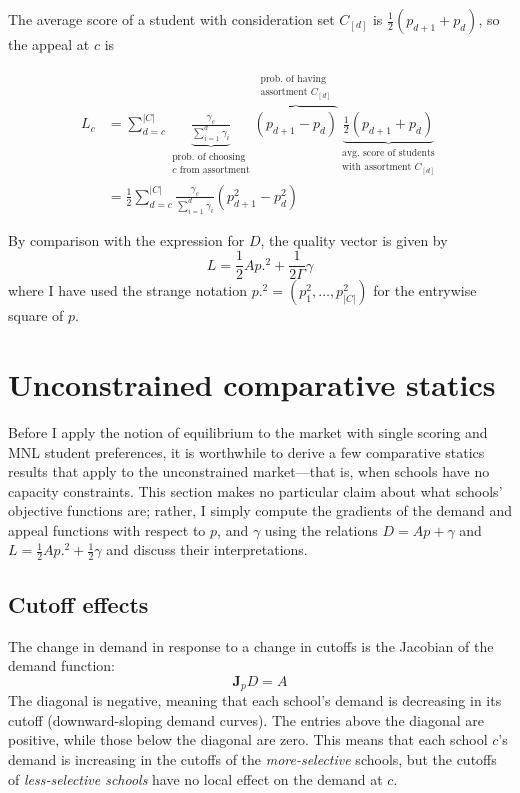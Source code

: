 \documentclass[12pt]{article}
\theoremstyle{definition}
\begin{document}
The average score of a student with consideration set $C_{[d]}$ is $\frac{1}{2}\left(p_{d+1} + p_d\right)$, so the appeal at $c$ is

\begin{align}
L_c &= \sum_{d=c}^{|C|} 
\underbrace{\frac{{\gamma_c}}{ \sum_{i=1}^d {\gamma_i}}}_{\substack{\text{prob. of choosing  }\\ c\text{ from assortment}}} 
\overbrace{\left(p_{d+1} - p_{d}\right)}^{\substack{\text{prob. of having}\\ \text{assortment }C_{[d]}}} 
\underbrace{\frac{1}{2}\left(p_{d+1} + p_{d}\right)}_{\substack{\text{avg. score of students}\\ \text{with assortment }C_{[d]}}} \\
&=\frac{1}{2}\sum_{d=c}^{|C|} 
\frac{{\gamma_c}}{ \sum_{i=1}^d {\gamma_i}} 
\left(p_{d+1}^2 -  p_{d}^2\right)
\end{align}

By comparison with the expression for $D$, the quality vector is given by 
\[L = \frac{1}{2} A p.^2 + \frac{1}{2\Gamma} \gamma\]
where I have used the strange notation $p.^2 = (p_1^2, \dots, p_{|C|}^2)$ for the entrywise square of $p$.






\section{Unconstrained comparative statics}
Before I apply the notion of equilibrium to the market with single scoring and MNL student preferences, it is worthwhile to derive a few comparative statics results that apply to the unconstrained market---that is, when schools have no capacity constraints. This section makes no particular claim about what schools' objective functions are; rather, I simply compute the gradients of the demand and appeal functions with respect to $p$, and $\gamma$ using the relations $D = Ap + \gamma$ and $L = \frac{1}{2} A p.^2 + \frac{1}{2}\gamma$ and discuss their interpretations.

\subsection{Cutoff effects}
The change in demand in response to a change in cutoffs is the Jacobian of the demand function:
\[\mathbf{J}_p D = A \]
The diagonal is negative, meaning that each school's demand is decreasing in its cutoff (downward-sloping demand curves). The entries above the diagonal are positive, while those below the diagonal are zero. This means that each school $c$'s demand is increasing in the cutoffs of the \emph{more-selective} schools, but the cutoffs of \emph{less-selective schools} have no local effect on the demand at $c$.
\end{document}
